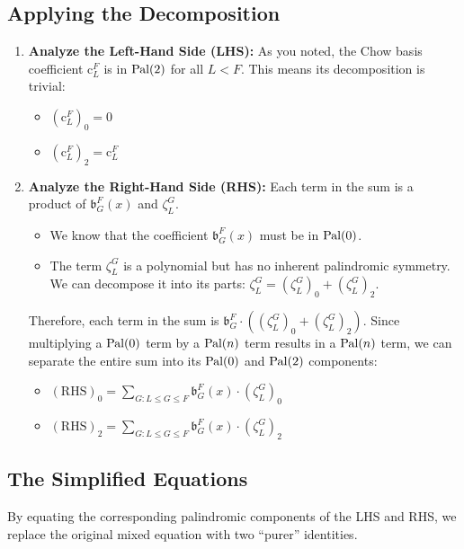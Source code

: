 \documentclass[11pt]{article}
\newcommand{\CbasisSub}[2]{\mathrm{c}^{#1}_{#2}}
\newcommand{\ZbasisSub}[2]{\zeta^{#1}_{#2}}
\newcommand{\Ibasis}[2]{\mathfrak{b}^{#1}_{#2}}
\newcommand{\pal}{\normalfont\text{Pal}}
\newcommand{\palcomp}[2]{\left(#1\right)_{#2}}
\theoremstyle{remark}
\begin{document}
\subsection{Applying the Decomposition}
\begin{enumerate}
    \item \textbf{Analyze the Left-Hand Side (LHS):} As you noted, the Chow basis coefficient $\CbasisSub{F}{L}$ is in $\pal(2)$ for all $L < F$. This means its decomposition is trivial:
    \begin{itemize}
        \item $\palcomp{\CbasisSub{F}{L}}{0} = 0$
        \item $\palcomp{\CbasisSub{F}{L}}{2} = \CbasisSub{F}{L}$
    \end{itemize}

    \item \textbf{Analyze the Right-Hand Side (RHS):} Each term in the sum is a product of $\Ibasis{F}{G}(x)$ and $\ZbasisSub{G}{L}$.
    \begin{itemize}
        \item We know that the coefficient $\Ibasis{F}{G}(x)$ must be in $\pal(0)$.
        \item The term $\ZbasisSub{G}{L}$ is a polynomial but has no inherent palindromic symmetry. We can decompose it into its parts: $\ZbasisSub{G}{L} = \palcomp{\ZbasisSub{G}{L}}{0} + \palcomp{\ZbasisSub{G}{L}}{2}$.
    \end{itemize}
    Therefore, each term in the sum is $\Ibasis{F}{G} \cdot (\palcomp{\ZbasisSub{G}{L}}{0} + \palcomp{\ZbasisSub{G}{L}}{2})$. Since multiplying a $\pal(0)$ term by a $\pal(n)$ term results in a $\pal(n)$ term, we can separate the entire sum into its $\pal(0)$ and $\pal(2)$ components:
    \begin{itemize}
        \item $(\text{RHS})_0 = \sum_{G: L \le G \le F} \Ibasis{F}{G}(x) \cdot \palcomp{\ZbasisSub{G}{L}}{0}$
        \item $(\text{RHS})_2 = \sum_{G: L \le G \le F} \Ibasis{F}{G}(x) \cdot \palcomp{\ZbasisSub{G}{L}}{2}$
    \end{itemize}
\end{enumerate}

\subsection{The Simplified Equations}
By equating the corresponding palindromic components of the LHS and RHS, we replace the original mixed equation with two ``purer'' identities.
\end{document}
